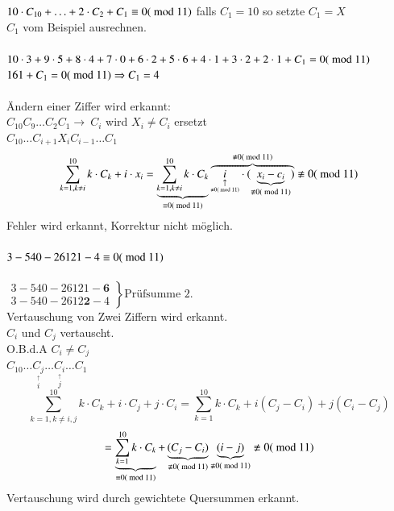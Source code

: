 \begin{enumerate}
$10\cdot C_{10}+\ldots + 2\cdot C_2 + C_1 \equiv 0(\textrm{ mod } 11)$ falls $C_1 = 10$ so setzte $C_1 = X$\\
$C_1$ vom Beispiel ausrechnen.\\
\\
$ 10\cdot 3+9\cdot 5+8\cdot 4+7\cdot 0+6\cdot 2+5\cdot 6+4\cdot 1+3\cdot 2+2\cdot 1+C_1 = 0 (\textrm{ mod } 11)$\\
$ 161 + C_1 = 0 (\textrm{ mod } 11) \Rightarrow C_1 = 4$\\
\\
\"Andern einer Ziffer wird erkannt:\\
$C_{10} C_9\ldots C_2 C_1 \rightarrow\ C_i$ wird $X_i \neq C_i$ ersetzt\\
$C_{10} \ldots C_{i+1} X_i C_{i-1} \ldots C_1$
\[
	\sum^{10}_{k=1, k \neq i} k \cdot C_k + i \cdot x_i = 
	\underbrace{\sum^{10}_{k=1, k \neq i} k \cdot C_k}_{\equiv 0 (\md 11)}
	\overbrace{
			\underset{\underset{\nequiv 0 (\md 11)}{\uparrow}}{i} 
			\cdot (\underbrace{x_i-c_i}_{\nequiv 0 (\md 11)}) 
	}^{\nequiv 0 (\md 11)}
	\nequiv 0(\md 11)	
\]
Fehler wird erkannt, Korrektur nicht m\"oglich.\\
\\
$3-540-26121-4 \equiv 0(\textrm{ mod } 11)$\\ \\
$\left.
\begin{matrix}
	3-540-26121-\mathbf{6} \\
	3-540-2612\mathbf{2}-4
\end{matrix}
\right\} \text{Pr\"ufsumme 2.}
$\\

Vertauschung von Zwei Ziffern wird erkannt.\\
$C_i$ und $C_j$ vertauscht.\\
O.B.d.A $C_i \neq C_j$\\
$C_{10} \ldots \underset{\stackrel{\uparrow}{i}}{C_j} \ldots \underset{\stackrel{\uparrow}{j}}{C_i} \ldots C_1$\\
\[
	\sum^{10}_{k=1, k\neq i,j} k \cdot C_k + i \cdot 	C_j + j \cdot C_i
	= \sum^{10}_{k=1} k \cdot C_k + i(C_j-C_i)+j(C_i-C_j)
\]
\[
	= 
	\underbrace{\sum^{10}_{k=1} k \cdot C_k}_{\equiv 0 (\md 11)}
	 + 
	 \underbrace{(C_j-C_i)}_{\nequiv 0 (\md 11)}
	 \underbrace{(i-j)}_{\nequiv 0 (\md 11)}
	 \nequiv 0 (\md 11)
\]
Vertauschung wird durch gewichtete Quersummen erkannt.



\end{enumerate}
